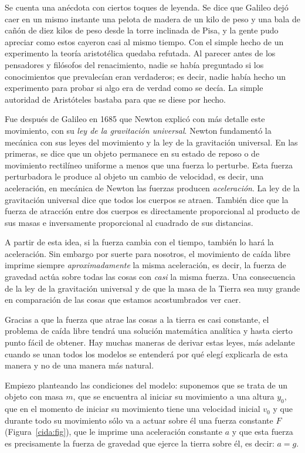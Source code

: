 Se cuenta una anécdota con ciertos toques de leyenda.
Se dice que Galileo dejó caer en un mismo instante una pelota de madera de un kilo de peso y una bala de cañón de diez kilos de peso desde la torre inclinada de Pisa, y la gente pudo apreciar como estos cayeron casi al mismo tiempo.
Con el simple hecho de un experimento la teoría aristotélica quedaba refutada.
Al parecer antes de los pensadores y filósofos del renacimiento, nadie se había preguntado si los conocimientos que prevalecían eran verdaderos; es decir, nadie había hecho un experimento para probar si algo era de verdad como se decía.
La simple autoridad de Aristóteles bastaba para que se diese por hecho.

Fue después de Galileo en 1685 que Newton explicó con más detalle este movimiento, con su \emph{ley de la gravitación universal}.
Newton fundamentó la mecánica con sus leyes del movimiento y la ley de la gravitación universal.
En las primeras, se dice que un objeto permanece en su estado de reposo o de movimiento rectilíneo uniforme a menos que una fuerza lo perturbe.
Esta fuerza perturbadora le produce al objeto un cambio de velocidad, es decir, una aceleración, en mecánica de Newton las fuerzas producen \emph{aceleración}.
La ley de la gravitación universal dice que todos los cuerpos se atraen.
También dice que la fuerza de atracción entre dos cuerpos es directamente proporcional al producto de sus masas e inversamente proporcional al cuadrado de sus distancias.

A partir de esta idea, si la fuerza cambia con el tiempo, también lo hará la aceleración.
Sin embargo por suerte para nosotros, el movimiento de caída libre imprime siempre \emph{aproximadamente} la misma aceleración, es decir, la fuerza de gravedad actúa sobre todas las cosas con \emph{casi} la misma fuerza.
Una consecuencia de la ley de la gravitación universal y de que la masa de la Tierra sea muy grande en comparación de las cosas que estamos acostumbrados ver caer.

Gracias a que la fuerza que atrae las cosas a la tierra es casi constante, el problema de caída libre tendrá una solución matemática analítica y hasta cierto punto fácil de obtener.
Hay muchas maneras de derivar estas leyes, más adelante cuando se unan todos los modelos se entenderá por qué elegí explicarla de esta manera y no de una manera más natural.

Empiezo planteando las condiciones del modelo: suponemos que se trata de un objeto con masa $m$, que se encuentra al iniciar su movimiento a una altura $y_0$, que en el momento de iniciar su movimiento tiene una velocidad inicial $v_0$ y que durante todo su movimiento sólo va a actuar sobre él una fuerza constante $F$ (Figura~\ref{cida:fig}), que le imprime una aceleración constante $a$ y que esta fuerza es precisamente la fuerza de gravedad que ejerce la tierra sobre él, es decir: $a = g$.

